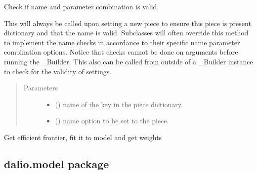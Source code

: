 \documentclass[letterpaper,10pt,english]{sphinxmanual}
\begin{document}
\begin{fulllineitems}
\begin{fulllineitems}
\label{\detokenize{dalio.pipe:dalio.pipe.OptimumWeights.check_name}}
Check if name and parameter combination is valid.

This will always be called upon setting a new piece to ensure this
piece is present dictionary and that the name is valid. Subclasses
will often override this method to implement the name checks in
accordance to their specific name parameter combination options.
Notice that checks cannot be done on arguments before running the
\_Builder. This also can be called from outside of a \_Builder instance
to check for the validity of settings.
\begin{quote}\begin{description}
\item[{Parameters}] \leavevmode\begin{itemize}
\item {} 
 () \textendash{} name of the key in the piece dictionary.

\item {} 
 () \textendash{} name option to be set to the piece.

\end{itemize}

\end{description}\end{quote}

\end{fulllineitems}


\begin{fulllineitems}
\label{\detokenize{dalio.pipe:dalio.pipe.OptimumWeights.transform}}
Get efficient frontier, fit it to model and get weights

\end{fulllineitems}


\end{fulllineitems}



\subsection{dalio.model package}
\label{\detokenize{dalio.model:dalio-model-package}}\label{\detokenize{dalio.model::doc}}
\end{document}
